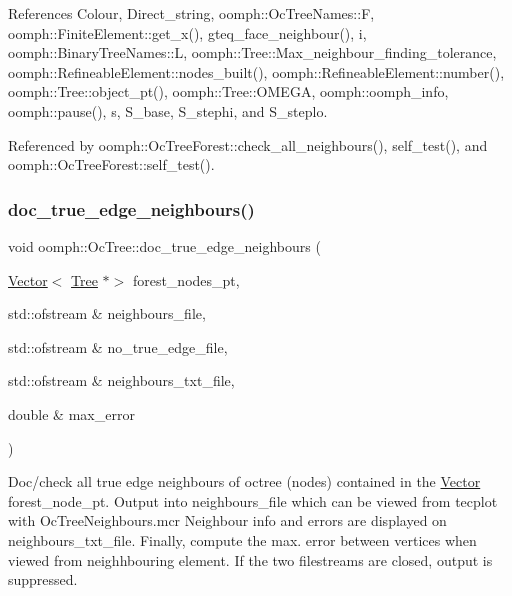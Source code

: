 References Colour, Direct\+\_\+string, oomph\+::\+Oc\+Tree\+Names\+::F, oomph\+::\+Finite\+Element\+::get\+\_\+x(), gteq\+\_\+face\+\_\+neighbour(), i, oomph\+::\+Binary\+Tree\+Names\+::L, oomph\+::\+Tree\+::\+Max\+\_\+neighbour\+\_\+finding\+\_\+tolerance, oomph\+::\+Refineable\+Element\+::nodes\+\_\+built(), oomph\+::\+Refineable\+Element\+::number(), oomph\+::\+Tree\+::object\+\_\+pt(), oomph\+::\+Tree\+::\+O\+M\+E\+GA, oomph\+::oomph\+\_\+info, oomph\+::pause(), s, S\+\_\+base, S\+\_\+stephi, and S\+\_\+steplo.



Referenced by oomph\+::\+Oc\+Tree\+Forest\+::check\+\_\+all\+\_\+neighbours(), self\+\_\+test(), and oomph\+::\+Oc\+Tree\+Forest\+::self\+\_\+test().

\mbox{\label{classoomph_1_1OcTree_aad0aadd0d308229ee85fd9e34bb21698}} 
\subsubsection{\texorpdfstring{doc\+\_\+true\+\_\+edge\+\_\+neighbours()}{doc\_true\_edge\_neighbours()}}
{\footnotesize\ttfamily void oomph\+::\+Oc\+Tree\+::doc\+\_\+true\+\_\+edge\+\_\+neighbours (\begin{DoxyParamCaption}\item[{\hyperlink{classoomph_1_1Vector}{Vector}$<$ \hyperlink{classoomph_1_1Tree}{Tree} $\ast$$>$}]{forest\+\_\+nodes\+\_\+pt,  }\item[{std\+::ofstream \&}]{neighbours\+\_\+file,  }\item[{std\+::ofstream \&}]{no\+\_\+true\+\_\+edge\+\_\+file,  }\item[{std\+::ofstream \&}]{neighbours\+\_\+txt\+\_\+file,  }\item[{double \&}]{max\+\_\+error }\end{DoxyParamCaption})\hspace{0.3cm}{\ttfamily [static]}}



Doc/check all true edge neighbours of octree (nodes) contained in the \hyperlink{classoomph_1_1Vector}{Vector} forest\+\_\+node\+\_\+pt. Output into neighbours\+\_\+file which can be viewed from tecplot with Oc\+Tree\+Neighbours.\+mcr Neighbour info and errors are displayed on neighbours\+\_\+txt\+\_\+file. Finally, compute the max. error between vertices when viewed from neighhbouring element. If the two filestreams are closed, output is suppressed. 

